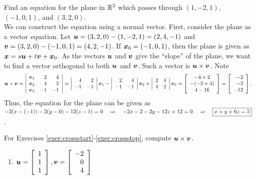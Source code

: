 \begin{Exam} Find an equation for the plane in $\R^3$ which passes through $(1,-2,1)$, $(-1,0,1)$, and $(3,2,0)$.\\ %

We can construct the equation using a normal vector. First, consider the plane as a vector equation. Let $\bb u = (3,2,0)-(1,-2,1) = (2,4,-1)$ and $\bb v = (3,2,0)-(-1,0,1) = (4,2,-1)$. If $\bb x_0 = (-1,0,1)$, then the plane is given as $\bb x = s\bb u + t\bb v + \bb x_0$. As the vectors $\bb u$ and $\bb v$ give the ``slope'' of the plane, we want to find a vector orthogonal to both $\bb u$ and $\bb v$. Such a vector is $\bb u \times \bb v$. Note
\[\bb u \times \bb v = \dtx{rrr}{\bb e_1 & 2 & 4 \\ \bb e_2 & 4 & 2 \\ \bb e_3 & -1 & -1} = \dtx{rr}{4&2\\-1&-1}\bb e_1 - \dtx{rr}{2&4\\-1&-1}\bb e_2 + \dtx{rr}{2&4\\4&2}\bb e_3 = \mtx{c}{-4+2\\-(-2+4)\\4-16} = \vr{-2\\-2\\-12}.\]
Thus, the equation for the plane can be given as $-2(x-(-1))-2(y-0) -12(z-1) = 0\\ \qRightarrow -2x-2-2y-12z+12 = 0 \qRightarrow \fbox{$x+y+6z = 5$}$.
\end{Exam}\vs


\noindent For Exercises \ref{exer:crossstart}-\ref{exer:crossstop}, compute $\bb u\times \bb v$.
\begin{enumerate}[!HW!, start=1, label=$\spadesuit$ \arabic*., ref=\arabic*]
\item\label{exer:crossstop} $\bb u =\vr{1\\1\\1}, \bb v = \vr{-2\\0\\4}$ %
\end{enumerate}

